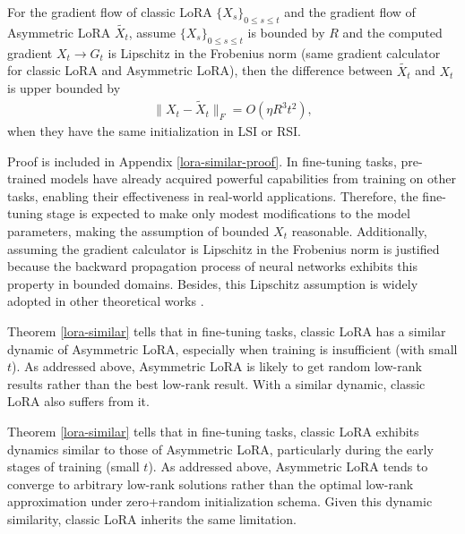 \begin{theorem}
    \label{lora-similar}
    For the gradient flow of classic LoRA $\{X_s\}_{0\leq s\leq t}$ and the gradient flow of Asymmetric LoRA $\tilde{X_t}$, assume $\{X_s\}_{0\leq s\leq t}$ is bounded by $R$ and the computed gradient $X_t\to G_t$ is Lipschitz in the Frobenius norm (same gradient calculator for classic LoRA and Asymmetric LoRA), then the difference between $\tilde{X_t}$ and $X_t$ is upper bounded by
    \begin{align}
        \|X_t-\tilde{X}_t\|_F=O(\eta R^3t^2),
    \end{align}
    when they have the same initialization in LSI or RSI. 
\end{theorem}
Proof is included in Appendix \ref{lora-similar-proof}. 
In fine-tuning tasks, pre-trained models have already acquired powerful capabilities from training on other tasks, enabling their effectiveness in real-world applications. Therefore, the fine-tuning stage is expected to make only modest modifications to the model parameters, making the assumption of bounded $X_t$ reasonable. Additionally, assuming the gradient calculator is Lipschitz in the Frobenius norm is justified because the backward propagation process of neural networks exhibits this property in bounded domains. Besides, this Lipschitz assumption is widely adopted in other theoretical works \cite{patel2022global}.

Theorem \ref{lora-similar} tells that in fine-tuning tasks, classic LoRA has a similar dynamic of Asymmetric LoRA, especially when training is insufficient (with small $t$). As addressed above, Asymmetric LoRA is likely to get random low-rank results rather than the best low-rank result. With a similar dynamic, classic LoRA also suffers from it. 

Theorem \ref{lora-similar} tells that in fine-tuning tasks, classic LoRA exhibits dynamics similar to those of Asymmetric LoRA, particularly during the early stages of training (small $t$). As addressed above, Asymmetric LoRA tends to converge to arbitrary low-rank solutions rather than the optimal low-rank approximation under zero+random initialization schema. Given this dynamic similarity, classic LoRA inherits the same limitation. 

























